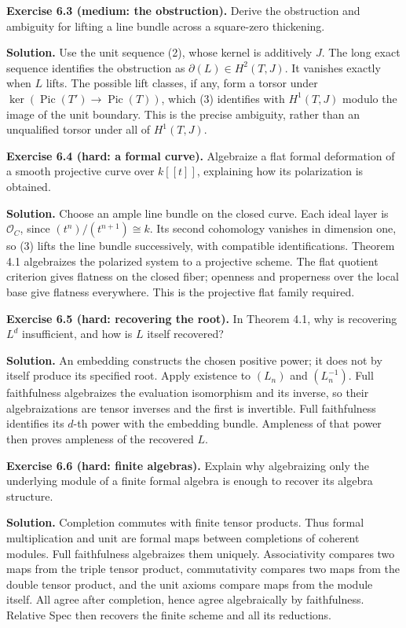\documentclass[11pt]{article}
\begin{document}
\textbf{Exercise 6.3 (medium: the obstruction).} Derive the obstruction
and ambiguity for lifting a line bundle across a square-zero thickening.

\textbf{Solution.} Use the unit sequence (2), whose kernel is additively
\(J\). The long exact sequence identifies the obstruction as
\(\partial(L)\in H^2(T,J)\). It vanishes exactly when \(L\) lifts. The
possible lift classes, if any, form a torsor under
\(\ker(\operatorname{Pic}(T')\to\operatorname{Pic}(T))\), which (3)
identifies with \(H^1(T,J)\) modulo the image of the unit boundary. This
is the precise ambiguity, rather than an unqualified torsor under all of
\(H^1(T,J)\).

\textbf{Exercise 6.4 (hard: a formal curve).} Algebraize a flat formal
deformation of a smooth projective curve over \(k[[t]]\), explaining how
its polarization is obtained.

\textbf{Solution.} Choose an ample line bundle on the closed curve. Each
ideal layer is \(\mathcal O_C\), since \((t^n)/(t^{n+1})\cong k\). Its
second cohomology vanishes in dimension one, so (3) lifts the line
bundle successively, with compatible identifications. Theorem 4.1
algebraizes the polarized system to a projective scheme. The flat
quotient criterion gives flatness on the closed fiber; openness and
properness over the local base give flatness everywhere. This is the
projective flat family required.

\textbf{Exercise 6.5 (hard: recovering the root).} In Theorem 4.1, why
is recovering \(L^d\) insufficient, and how is \(L\) itself recovered?

\textbf{Solution.} An embedding constructs the chosen positive power; it
does not by itself produce its specified root. Apply existence to
\((L_n)\) and \((L_n^{-1})\). Full faithfulness algebraizes the
evaluation isomorphism and its inverse, so their algebraizations are
tensor inverses and the first is invertible. Full faithfulness
identifies its \(d\)-th power with the embedding bundle. Ampleness of
that power then proves ampleness of the recovered \(L\).

\textbf{Exercise 6.6 (hard: finite algebras).} Explain why algebraizing
only the underlying module of a finite formal algebra is enough to
recover its algebra structure.

\textbf{Solution.} Completion commutes with finite tensor products. Thus
formal multiplication and unit are formal maps between completions of
coherent modules. Full faithfulness algebraizes them uniquely.
Associativity compares two maps from the triple tensor product,
commutativity compares two maps from the double tensor product, and the
unit axioms compare maps from the module itself. All agree after
completion, hence agree algebraically by faithfulness. Relative Spec
then recovers the finite scheme and all its reductions.
\end{document}
